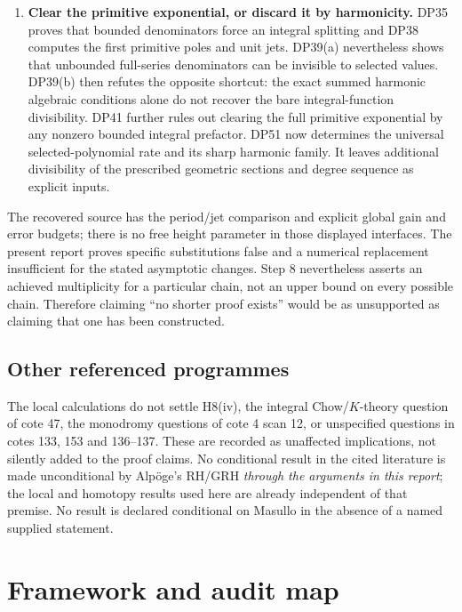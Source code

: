 \documentclass[11pt,a4paper]{article}
\theoremstyle{definition}\newtheorem{remark}[theorem]{Remark}
\begin{document}
\begin{enumerate}[leftmargin=*,label=\arabic*.]
\item \textbf{Clear the primitive exponential, or discard it by harmonicity.} DP35 proves that bounded denominators force an integral splitting and DP38 computes the first primitive poles and unit jets. DP39(a) nevertheless shows that unbounded full-series denominators can be invisible to selected values. DP39(b) then refutes the opposite shortcut: the exact summed harmonic algebraic conditions alone do not recover the bare integral-function divisibility. DP41 further rules out clearing the full primitive exponential by any nonzero bounded integral prefactor. DP51 now determines the universal selected-polynomial rate and its sharp harmonic family. It leaves additional divisibility of the prescribed geometric sections and degree sequence as explicit inputs.
\end{enumerate}
The recovered source has the period/jet comparison and explicit global gain and error budgets; there is no free height parameter in those displayed interfaces. The present report proves specific substitutions false and a numerical replacement insufficient for the stated asymptotic changes. Step 8 nevertheless asserts an achieved multiplicity for a particular chain, not an upper bound on every possible chain. Therefore claiming ``no shorter proof exists'' would be as unsupported as claiming that one has been constructed.

\subsection{Other referenced programmes}

The local calculations do not settle H8(iv), the integral Chow/$K$-theory question of cote 47, the monodromy questions of cote 4 scan 12, or unspecified questions in cotes 133, 153 and 136--137. These are recorded as unaffected implications, not silently added to the proof claims. No conditional result in the cited literature is made unconditional by Alp\"oge's RH/GRH \emph{through the arguments in this report}; the local and homotopy results used here are already independent of that premise. No result is declared conditional on Masullo in the absence of a named supplied statement.

\section{Framework and audit map}
\end{document}
